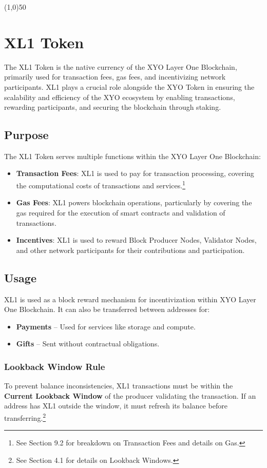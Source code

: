 \documentclass{article}
\begin{document}
\begin{center}
    \line(1,0){50}
\end{center}

\section{XL1 Token}
The XL1 Token is the native currency of the XYO Layer One Blockchain, primarily used for transaction fees, gas fees, and incentivizing network participants. XL1 plays a crucial role alongside the XYO Token in ensuring the scalability and efficiency of the XYO ecosystem by enabling transactions, rewarding participants, and securing the blockchain through staking. 

\subsection{Purpose}
The XL1 Token serves multiple functions within the XYO Layer One Blockchain: 

\begin{itemize}
    \item \textbf{Transaction Fees}: XL1 is used to pay for transaction processing, covering the computational costs of transactions and services.\footnote{See Section 9.2 for breakdown on Transaction Fees and details on Gas.}
    \item \textbf{Gas Fees}: XL1 powers blockchain operations, particularly by covering the gas required for the execution of smart contracts and validation of transactions.
    \item \textbf{Incentives}: XL1 is used to reward Block Producer Nodes, Validator Nodes, and other network participants for their contributions and participation.
\end{itemize}

\subsection{Usage}
XL1 is used as a block reward mechanism for incentivization within XYO Layer One Blockchain. It can also be transferred between addresses for:
\begin{itemize}
    \item \textbf{Payments} – Used for services like storage and compute.
    \item \textbf{Gifts} – Sent without contractual obligations.
\end{itemize}

\subsubsection{Lookback Window Rule}
To prevent balance inconsistencies, XL1 transactions must be within the
\textbf{Current Lookback Window} of the producer validating the transaction. If
an address has XL1 outside the window, it must refresh its balance before
transferring.\footnote{See Section 4.1 for details on Lookback Windows.}
\end{document}
